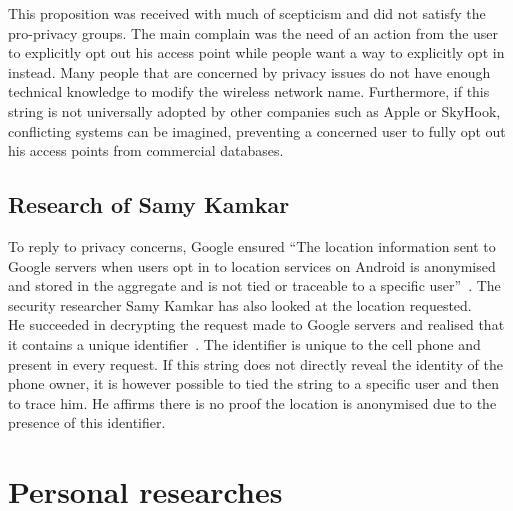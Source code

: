 This proposition was received with much of scepticism and did not satisfy the pro-privacy groups.
The main complain was the need of an action from the user to explicitly opt out his access point while people want a way to explicitly opt in instead.
Many people that are concerned by privacy issues do not have enough technical knowledge to modify the wireless network name.
Furthermore, if this string is not universally adopted by other companies such as Apple or SkyHook, conflicting systems can be imagined, preventing a concerned user to fully opt out his access points from commercial databases.

\subsection{Research of Samy Kamkar}
\label{sec:andro-samy}

To reply to privacy concerns, Google ensured ``The location information sent to Google servers when users opt in to location services on Android is anonymised and stored in the aggregate and is not tied or traceable to a specific user''~\cite{loc-not-traceable}.
The security researcher Samy Kamkar has also looked at the location requested.\\


He succeeded in decrypting the request made to Google servers and realised that it contains a unique identifier~\cite{cnet-andr-samy}.
The identifier is unique to the cell phone and present in every request.
If this string does not directly reveal the identity of the phone owner, it is however possible to tied the string to a specific user and then to trace him.
He affirms there is no proof the location is anonymised due to the presence of this identifier.\\

\section{Personal researches}
\label{sec:andro-perso-research}

